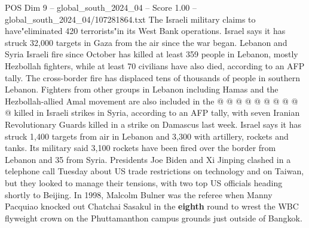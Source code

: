 \begin{textsample}{POS Dim 9 – global\_south\_2024\_04 – Score 1.00 – global\_south\_2024\_04/107281864.txt}
The Israeli military claims to have"eliminated 420 terrorists"in its West Bank operations.
Israel says it has struck 32,000 targets in Gaza from the air since the war began.
Lebanon and Syria Israeli fire since October has killed at least 359 people in Lebanon, mostly Hezbollah fighters, while at least 70 civilians have also died, according to an AFP tally.
The cross-border fire has displaced tens of thousands of people in southern Lebanon.
Fighters from other groups in Lebanon including Hamas and the Hezbollah-allied Amal movement are also included in the @ @ @ @ @ @ @ @ @ @ killed in Israeli strikes in Syria, according to an AFP tally, with seven Iranian Revolutionary Guards killed in a strike on Damascus last week.
Israel says it has struck 1,400 targets from air in Lebanon and 3,300 with artillery, rockets and tanks.
Its military said 3,100 rockets have been fired over the border from Lebanon and 35 from Syria.
Presidents Joe Biden and Xi Jinping clashed in a telephone call Tuesday about US trade restrictions on technology and on Taiwan, but they looked to manage their tensions, with two top US officials heading shortly to Beijing.
In 1998, Malcolm Bulner was the referee when Manny Pacquiao knocked out Chatchai Sasakul in the \textbf{eighth} round to wrest the WBC flyweight crown on the Phuttamanthon campus grounds just outside of Bangkok.

\end{textsample}
